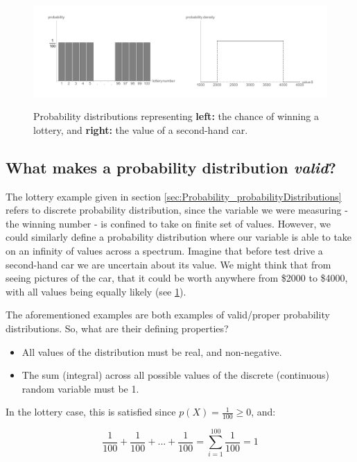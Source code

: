\documentclass[11pt,fullpage]{book}
\begin{document}
\begin{figure}
\centering
\scalebox{0.3} 
{\includegraphics{Probability_lotterySecondhandCarProbability.pdf}}
\caption{Probability distributions representing \textbf{left:} the chance of winning a lottery, and \textbf{right:} the value of a second-hand car.}\label{fig:Probability_lotterySecondhandCarProbability}
\end{figure}

\subsection{What makes a probability distribution \textit{valid}?}\label{sec:Probability_validProbabilityDistribution}
The lottery example given in section \ref{sec:Probability_probabilityDistributions} refers to discrete probability distribution, since the variable we were measuring - the winning number - is confined to take on finite set of values. However, we could similarly define a probability distribution where our variable is able to take on an infinity of values across a spectrum. Imagine that before test drive a second-hand car we are uncertain about its value. We might think that from seeing pictures of the car, that it could be worth anywhere from \$2000 to \$4000, with all values being equally likely (see \ref{fig:Probability_lotterySecondhandCarProbability}).

The aforementioned examples are both examples of valid/proper probability distributions. So, what are their defining properties?

\begin{itemize}
\item All values of the distribution must be real, and non-negative.
\item The sum (integral) across all possible values of the discrete (continuous) random variable must be 1.
\end{itemize}

In the lottery case, this is satisfied since $p(X)=\frac{1}{100}\geq 0$, and:

\begin{equation}
\frac{1}{100} + \frac{1}{100} + ... + \frac{1}{100} = \sum\limits_{i=1}^{100} \frac{1}{100} = 1
\end{equation}
\end{document}
